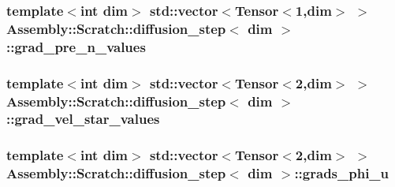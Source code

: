 \subsubsection[{grad\+\_\+pre\+\_\+n\+\_\+values}]{\setlength{\rightskip}{0pt plus 5cm}template$<$int dim$>$ std\+::vector$<$Tensor$<$1,dim$>$ $>$ {\bf Assembly\+::\+Scratch\+::diffusion\+\_\+step}$<$ dim $>$\+::grad\+\_\+pre\+\_\+n\+\_\+values}\label{struct_assembly_1_1_scratch_1_1diffusion__step_aa11a441604ebd698e5294c6ab3a1ffaf}
\hypertarget{struct_assembly_1_1_scratch_1_1diffusion__step_a63260a19549621cb2c9c737a0a43e3f5}{}
\subsubsection[{grad\+\_\+vel\+\_\+star\+\_\+values}]{\setlength{\rightskip}{0pt plus 5cm}template$<$int dim$>$ std\+::vector$<$Tensor$<$2,dim$>$ $>$ {\bf Assembly\+::\+Scratch\+::diffusion\+\_\+step}$<$ dim $>$\+::grad\+\_\+vel\+\_\+star\+\_\+values}\label{struct_assembly_1_1_scratch_1_1diffusion__step_a63260a19549621cb2c9c737a0a43e3f5}
\hypertarget{struct_assembly_1_1_scratch_1_1diffusion__step_a8d840d813840efeef8363b9630714e6d}{}
\subsubsection[{grads\+\_\+phi\+\_\+u}]{\setlength{\rightskip}{0pt plus 5cm}template$<$int dim$>$ std\+::vector$<$Tensor$<$2,dim$>$ $>$ {\bf Assembly\+::\+Scratch\+::diffusion\+\_\+step}$<$ dim $>$\+::grads\+\_\+phi\+\_\+u}\label{struct_assembly_1_1_scratch_1_1diffusion__step_a8d840d813840efeef8363b9630714e6d}
\hypertarget{struct_assembly_1_1_scratch_1_1diffusion__step_af7bfee637fae1cadfde75192f16c0684}{}
